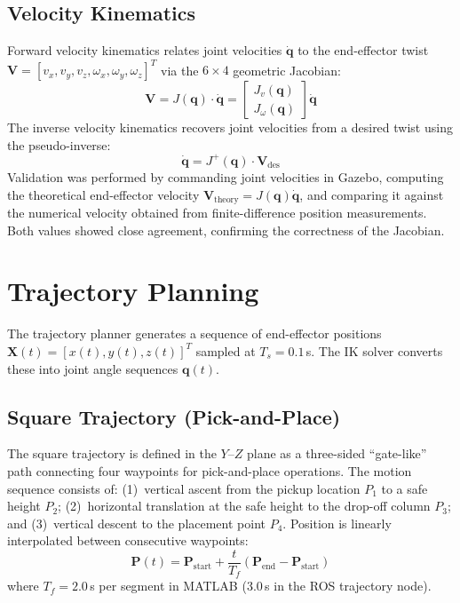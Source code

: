 \documentclass[conference]{IEEEtran}
\begin{document}
\subsection{Velocity Kinematics}

Forward velocity kinematics relates joint velocities $\dot{\mathbf{q}}$ to the end-effector twist $\mathbf{V} = [v_x, v_y, v_z, \omega_x, \omega_y, \omega_z]^T$ via the $6 \times 4$ geometric Jacobian:
\begin{equation}
\mathbf{V} = J(\mathbf{q}) \cdot \dot{\mathbf{q}} = \begin{bmatrix} J_v(\mathbf{q}) \\ J_\omega(\mathbf{q}) \end{bmatrix} \dot{\mathbf{q}}
\label{eq:vel_fk}
\end{equation}
The inverse velocity kinematics recovers joint velocities from a desired twist using the pseudo-inverse:
\begin{equation}
\dot{\mathbf{q}} = J^+(\mathbf{q}) \cdot \mathbf{V}_{\text{des}}
\label{eq:vel_ik}
\end{equation}
Validation was performed by commanding joint velocities in Gazebo, computing the theoretical end-effector velocity $\mathbf{V}_{\text{theory}} = J(\mathbf{q})\dot{\mathbf{q}}$, and comparing it against the numerical velocity obtained from finite-difference position measurements. Both values showed close agreement, confirming the correctness of the Jacobian.

\section{Trajectory Planning}

The trajectory planner generates a sequence of end-effector positions $\mathbf{X}(t) = [x(t), y(t), z(t)]^T$ sampled at $T_s = 0.1$\,s. The IK solver converts these into joint angle sequences $\mathbf{q}(t)$.

\subsection{Square Trajectory (Pick-and-Place)}

The square trajectory is defined in the $Y$--$Z$ plane as a three-sided ``gate-like'' path connecting four waypoints for pick-and-place operations. The motion sequence consists of: (1)~vertical ascent from the pickup location $P_1$ to a safe height $P_2$; (2)~horizontal translation at the safe height to the drop-off column $P_3$; and (3)~vertical descent to the placement point $P_4$. Position is linearly interpolated between consecutive waypoints:
\begin{equation}
\mathbf{P}(t) = \mathbf{P}_{\text{start}} + \frac{t}{T_f}(\mathbf{P}_{\text{end}} - \mathbf{P}_{\text{start}})
\label{eq:square}
\end{equation}
where $T_f = 2.0$\,s per segment in MATLAB (3.0\,s in the ROS trajectory node).
\end{document}
